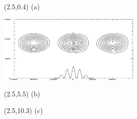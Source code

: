 \documentclass{article}
\begin{document}
\begin{textblock}{1}(2.5,0.4)
\normalsize
(a)
\end{textblock}
\footnotesize
\hspace{0.15in}\includegraphics[width=2.75in]{img/schaer-btf-4thorder.png}

\begin{textblock}{1}(2.5,5.5)
\normalsize
(b)
\end{textblock}


\begin{textblock}{1}(2.5,10.3)
\normalsize
(c)
\end{textblock}

\end{document}
